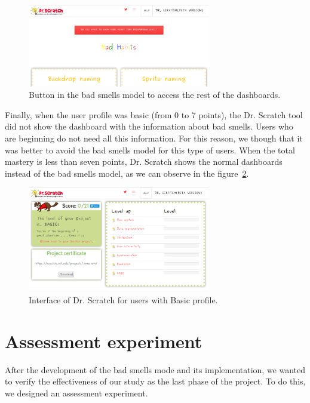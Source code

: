 \begin{figure}
    \centering
    \includegraphics[width=8cm,                         keepaspectratio]{img/button.png}
    \caption{Button in the bad smells model to access the rest of the dashboards.}
    \label{fig:button}
\end{figure}


Finally, when the user profile was basic (from 0 to 7 points), the Dr. Scratch tool did not show the dashboard with the information about bad smells. Users who are beginning do not need all this information. For this reason, we though that it was better to avoid the bad smells model for this type of users. When the total mastery is less than seven points, Dr. Scratch shows the normal dashboards instead of the bad smells model, as we can observe in the figure~\ref{fig:basic_level}.

\begin{figure}
    \centering
    \includegraphics[width=8cm,                         keepaspectratio]{img/basic_level.png}
    \caption{Interface of Dr. Scratch for users with Basic profile.}
    \label{fig:basic_level}
\end{figure}


\section{Assessment experiment}
\label{sec:experiment}

After the development of the bad smells mode and its implementation, we wanted to verify the effectiveness of our study as the last phase of the project. To do this, we designed an assessment experiment.

